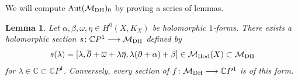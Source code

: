 \documentclass[pdftex]{sigma}
\numberwithin{equation}{section}
\newtheorem{Lemma}[Theorem]{Lemma}
\begin{document}
We will compute $\operatorname{Aut}(\mathcal M_{\rm DH})_0$ by proving a series of lemmas.
\begin{Lemma}\label{sections}
Let $\alpha, \beta, \omega, \eta \in H^0(X, K_X)$ be holomorphic $1$-forms. There exists a holomorphic section $s \colon {\mathbb C}P^1 \longrightarrow {\mathcal M}_{\rm DH}$ defined by
\begin{gather*}s(\lambda) = [\lambda, \overline{\partial}+\overline{\omega}+\lambda\overline{\eta}, \lambda(\partial+\alpha)+\beta] \in \mathcal M_{\rm Hod}(X)
 \subset {\mathcal M}_{\rm DH}\end{gather*}
for $\lambda \in {\mathbb C} \subset \mathbb CP^1$. Conversely, every section of $f \colon {\mathcal M}_{\rm DH} \longrightarrow {\mathbb C}P^1 $ is of this form.
\end{Lemma}
\end{document}
